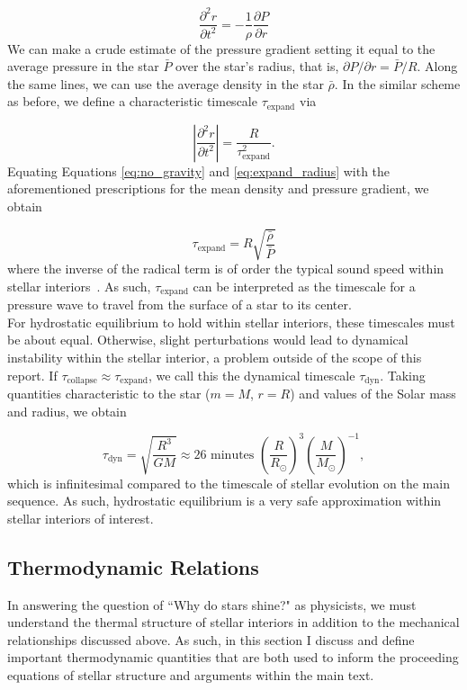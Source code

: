 \documentclass[12pt]{article}
\newcommand{\pderiv}[2]{\frac{\partial #1}{\partial #2}}
\newcommand{\dblpderiv}[2]{\frac{\partial^2 #1}{\partial #2 ^2}}
\newcommand{\bigparenthesis}[1]{\left(#1\right)}
\begin{document}
\begin{equation}
 \dblpderiv{r}{t} = -\frac{1}{\rho}\pderiv{P}{r} \label{eq:no_gravity}
\end{equation}
%
We can make a crude estimate of the pressure gradient setting it equal to the average pressure in the star $\bar{P}$ over the star's radius, that is, $\partial P/\partial r = \bar{P}/R$. Along the same lines, we can use the average density in the star $\bar{\rho}$. In the similar scheme as before, we define a characteristic timescale $\tau_\mathrm{expand}$ via

\begin{equation}
    \left|\dblpderiv{r}{t}\right| = \frac{R}{\tau_\mathrm{expand}^2} \label{eq:expand_radius}.
\end{equation}
%
Equating Equations \ref{eq:no_gravity} and \ref{eq:expand_radius} with the aforementioned prescriptions for the mean density and pressure gradient, we obtain

\begin{equation}
    \tau_\mathrm{expand} = R \sqrt{\frac{\bar{\rho}}{\bar{P}}}
\end{equation}
%
where the inverse of the radical term is of order the typical sound speed within stellar interiors~\cite{KWW_book}. As such, $\tau_\mathrm{expand}$ can be interpreted as the timescale for a pressure wave to travel from the surface of a star to its center. \\

For hydrostatic equilibrium to hold within stellar interiors, these timescales must be about equal. Otherwise, slight  perturbations would lead to dynamical instability within the stellar interior, a problem outside of the scope of this report. If $\tau_\mathrm{collapse} \approx \tau_\mathrm{expand}$, we call this the dynamical timescale $\tau_\mathrm{dyn}$. Taking quantities characteristic to the star ($m = M$, $r = R$) and values of the Solar mass and radius, we obtain

\begin{equation}
    \tau_\mathrm{dyn} = \sqrt{\frac{R^3}{GM}} \approx 26 \text{ minutes } \bigparenthesis{\frac{R}{R_\odot}}^3 \bigparenthesis{\frac{M}{M_\odot}}^{-1},
\end{equation}
%
which is infinitesimal compared to the timescale of stellar evolution on the main sequence. As such, hydrostatic equilibrium is a very safe approximation within stellar interiors of interest. 

\subsection{Thermodynamic Relations}
In answering the question of ``Why do stars shine?" as physicists, we must understand the thermal structure of stellar interiors in addition to the mechanical relationships discussed above. As such, in this section I discuss and define important thermodynamic quantities that are both used to inform the proceeding equations of stellar structure and arguments within the main text. \\
\end{document}
